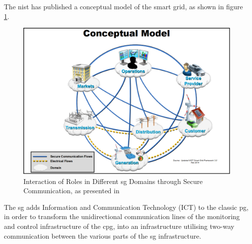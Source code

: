 The \acrfull{nist} has published a conceptual model of the smart grid, as shown in 
figure \ref{fig:NIST-SmartGRID-ConceptualModel}.



\begin{figure}[ht]
\includegraphics[width=\linewidth]{figures/NIST-SmartGRID-ConceptualModel.png}
\caption[Interactions of roles in SmartGrid Domains]{Interaction of Roles in Different \acrlong{sg} Domains through Secure Communication, as presented in \cite{gopstein2021nist}}
\label{fig:NIST-SmartGRID-ConceptualModel}
\end{figure}






The \acrlong{sg} adds Information and Communication Technology (ICT) to the classic \acrlong{pg}, in order to transform the  unidirectional communication lines of the monitoring and control infrastructure of the \acrlong{cpg}, into an infrastructure utilising two-way communication between the various parts of the \acrlong{sg} infrastructure. 








